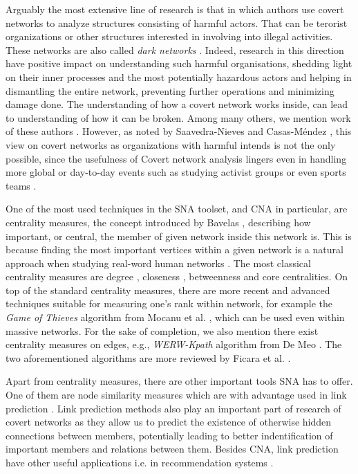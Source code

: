Arguably the most extensive line of research is that in which authors use covert networks to analyze structures consisting of
harmful actors.
That can be terorist organizations or other structures interested in involving into illegal activities. These networks are
also called \emph{dark networks} \cite{Raab2003}.
Indeed, research in this direction have positive impact on understanding such harmful organisations,
shedding light on their inner processes and the most potentially hazardous actors and helping in dismantling the entire network,
preventing further operations and minimizing damage done.
The understanding of how a covert network works inside, can lead to understanding of how it can be broken.
Among many others, we mention work of these authors \cite{Waniek2017,Dey2019,Raab2003,Lindelauf2009,Xu2005,Ressler2006}.
However, as noted by Saavedra-Nieves and Casas-Méndez \cite{SaavedraNieves2023}, this view on covert networks as organizations with harmful
intends is not the only possible, since the usefulness of Covert network analysis lingers even in handling more global or day-to-day events
such as studying activist groups \cite{Crossley2012} or even sports teams \cite{Buldú2019}.

One of the most used techniques in the SNA toolset, and CNA in particular, are centrality measures,
the concept introduced by Bavelas \cite{Bavelas1948},
describing how important, or central, the member of given network inside this network is.
This is because finding the most important vertices within a given network is a natural approach when studying real-word human networks \cite{Crescenzi2016}.
    The most classical centrality measures are degree \cite{Shaw1954}, closeness \cite{Beauchamp1965},
    betweenness \cite{Anthonisse1971,Freeman1977} and core \cite{Seidman1983} centralities.
On top of the standard centrality measures, there are more recent and advanced techniques suitable for measuring one's rank within network,
for example the \emph{Game of Thieves} algorithm from Mocanu et al. \cite{Mocanu2018}, which can be used even within massive networks.
For the sake of completion, we also mention there exist centrality measures on edges, e.g.,
\emph{WERW-Kpath} algorithm from {De Meo} \cite{DeMeo2013}.
The two aforementioned algorithms are more reviewed by Ficara et al. \cite{Ficara2021}.

Apart from centrality measures, there are other important tools SNA has to offer.
One of them are node similarity measures which are with advantage used in link prediction \cite{Zhou2009,Wang2014}.
Link prediction methods also play an important part of research of covert networks
as they allow us to predict the existence of otherwise hidden connections between members, potentially leading to
better indentification of important members and relations between them.
Besides CNA, link prediction have other useful applications i.e. in recommendation systems \cite{Huang2005,Talasu2017}.

